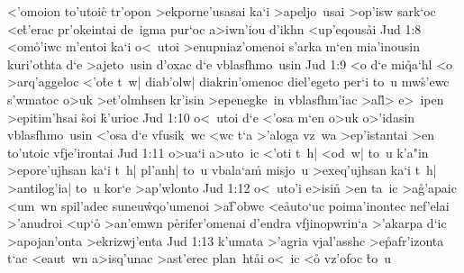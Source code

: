<'omoion
to'utoic\r{}
tr'opon
>ekporne'usasai
ka`i
>apeljo~usai
>op'isw
sark`oc
<e\r{t}'erac
pr'okeintai
de~igma
pur`oc
a>iwn'iou
d'ikhn
<up'eqous\r{a}i\bibvsend
{}
\vs Jud 1:8
<om\r{o}'iwc
m'entoi
ka`i
o<~utoi
>enupniaz'omenoi
s'arka
m`en
mia'inousin
kuri'othta
d`e
>ajeto~usin
d'oxac
d`e
vblasfhmo~usin\bibvsend
\vs Jud 1:9
<o
d`e
mi\r{q}a`hl
<o
>arq'aggeloc
<'o\r{t}e
t~w|
diab'olw|
diakrin'omenoc
diel'egeto
per`i
to~u
mw\r{s}'ewc
s'wmatoc
o>uk
>et'olmhsen
kr'isin
>epenegke~in
vblasfhm'iac
>al\r{l}>
e>~ipen
>epitim'hsai
\r{s}oi
\r{k}'urioc\bibvsend
{}
\vs Jud 1:10
o<~utoi
d`e
<'osa
m`en
o>uk
o>'idasin
vblasfhmo~usin
<'osa
d`e
vfusik~wc
<wc
t`a
>'aloga
vz~wa
>ep'istantai
>en
to'utoic
vfje'irontai\bibvsend
\vs Jud 1:11
o>ua`i
a>uto~ic
<'oti
t~h|
<od~w|
to~u
k'a"in
>epore'ujhsan
ka`i
t~h|
pl'anh|
to~u
vbala`a\r{m}
misjo~u
>exeq'ujhsan
ka`i
t~h|
>antilog'ia|
to~u
kor`e
>ap'wlonto\bibvsend
\vs Jud 1:12
o<~uto'i
e>isi\r{n}
>en
ta~ic
>a\r{g}'apaic
<um~wn
spil'adec
suneu\r{w}qo'umenoi
>a\r{f}'obwc
<e\r{a}uto`uc
poima'inontec
nef'elai
>'anudroi
<up`o\r{}
>an'emwn
p\r{e}rifer'omenai
d'endra
vfjinopwrin`a
>'akarpa
d`ic
>apojan'onta
>ekrizwj'enta\bibvsend
\vs Jud 1:13
k'umata
>'agria
vjal'asshc
>e\r{p}afr'izonta
t`ac
<eaut~wn
a>isq'unac
>ast'erec
plan~ht\r{a}i
o<~ic
<o\r{}
vz'ofoc
\r{t}o~u
